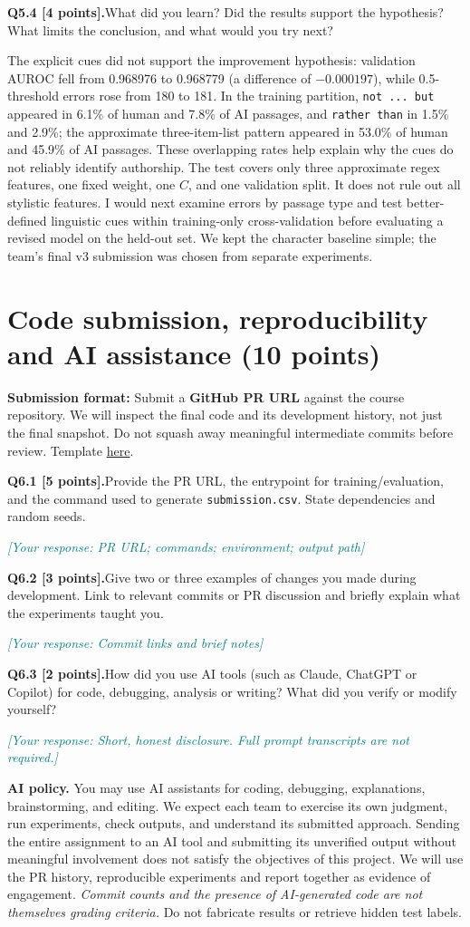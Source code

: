 \documentclass[11pt,letterpaper]{article}
\newcommand{\placeholder}[1]{\par\noindent\textcolor{teal}{\textit{[Your response: #1]}}\par\vspace{0.3em}}
\newcommand{\question}[2]{\needspace{4\baselineskip}\par\addvspace{0.45em}\noindent\textbf{#1}\quad #2\par\nobreak\vspace{0.1em}}
\begin{document}
\question{Q5.4 [4 points].}{What did you learn? Did the results support the hypothesis? What limits the conclusion, and what would you try next?}
The explicit cues did not support the improvement hypothesis: validation AUROC fell from 0.968976 to 0.968779 (a difference of $-0.000197$), while 0.5-threshold errors rose from 180 to 181. In the training partition, \texttt{not ... but} appeared in 6.1\% of human and 7.8\% of AI passages, and \texttt{rather than} in 1.5\% and 2.9\%; the approximate three-item-list pattern appeared in 53.0\% of human and 45.9\% of AI passages. These overlapping rates help explain why the cues do not reliably identify authorship. The test covers only three approximate regex features, one fixed weight, one $C$, and one validation split. It does not rule out all stylistic features. I would next examine errors by passage type and test better-defined linguistic cues within training-only cross-validation before evaluating a revised model on the held-out set. We kept the character baseline simple; the team's final v3 submission was chosen from separate experiments.
\section{Code submission, reproducibility and AI assistance (10 points)}
\textbf{Submission format:} Submit a \textbf{GitHub PR URL} against the course repository. We will inspect the final code and its development history, not just the final snapshot. Do not squash away meaningful intermediate commits before review. Template \href{https://github.com/sekhari/human-or-ai-submissions}{here}.

\question{Q6.1 [5 points].}{Provide the PR URL, the entrypoint for training/evaluation, and the command used to generate \texttt{submission.csv}. State dependencies and random seeds.}
\placeholder{PR URL; commands; environment; output path}
\question{Q6.2 [3 points].}{Give two or three examples of changes you made during development. Link to relevant commits or PR discussion and briefly explain what the experiments taught you.}
\placeholder{Commit links and brief notes}
\question{Q6.3 [2 points].}{How did you use AI tools (such as Claude, ChatGPT or Copilot) for code, debugging, analysis or writing? What did you verify or modify yourself?}
\placeholder{Short, honest disclosure. Full prompt transcripts are not required.}

\textbf{AI policy.} You may use AI assistants for coding, debugging, explanations, brainstorming, and editing. We expect each team to exercise its own judgment, run experiments, check outputs, and understand its submitted approach. Sending the entire assignment to an AI tool and submitting its unverified output without meaningful involvement does not satisfy the objectives of this project. We will use the PR history, reproducible experiments and report together as evidence of engagement. \emph{Commit counts and the presence of AI-generated code are not themselves grading criteria.} Do not fabricate results or retrieve hidden test labels.
\end{document}
